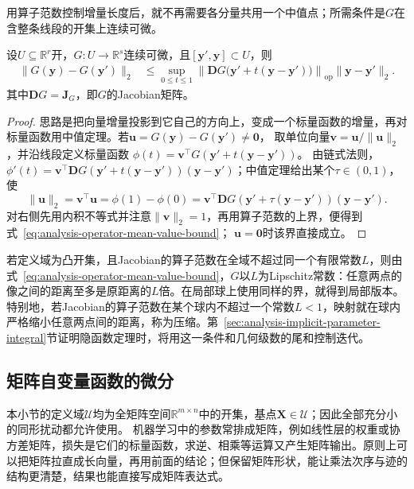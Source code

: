 用算子范数控制增量长度后，就不再需要各分量共用一个中值点；所需条件是$G$在含整条线段的开集上连续可微。
\begin{theorem}[向量值函数的中值估计]
\label{thm:multivariable-vector-mean-value}
设$U\subseteq\mathbb R^r$开，$G:U\to\mathbb R^s$连续可微，且$[\bm y',\bm y]\subset U$，则
\begin{equation}
  \begin{aligned}
  \lVert G(\bm{y})-G(\bm{y}')\rVert_2
  &\leq
  \sup_{0\leq t\leq1}
  \left\lVert
    \bm{D}G\bigl(\bm{y}'+t(\bm{y}-\bm{y}')\bigr)
  \right\rVert_{\mathrm{op}}
  \lVert\bm{y}-\bm{y}'\rVert_2.
  \end{aligned}
\label{eq:analysis-operator-mean-value-bound}
\end{equation}
其中$\bm DG=\bm J_G$，即$G$的Jacobian矩阵。
\end{theorem}
\begin{proof}
思路是把向量增量投影到它自己的方向上，变成一个标量函数的增量，再对标量函数用中值定理。若$\bm u=G(\bm y)-G(\bm y')\neq\bm0$，
取单位向量$\bm v=\bm u/\lVert\bm u\rVert_2$，并沿线段定义标量函数
$\phi(t)=\bm v^\top G(\bm y'+t(\bm y-\bm y'))$。
由链式法则，$\phi'(t)=\bm v^\top\bm DG(\bm y'+t(\bm y-\bm y'))(\bm y-\bm y')$；中值定理给出某个$\tau\in(0,1)$，使
\[
 \lVert\bm u\rVert_2
 =\bm v^\top\bm u
 =\phi(1)-\phi(0)
 =\bm v^\top\bm DG(\bm y'+\tau(\bm y-\bm y'))(\bm y-\bm y').
\]
对右侧先用内积不等式并注意$\lVert\bm v\rVert_2=1$，再用算子范数的上界，便得到式~\eqref{eq:analysis-operator-mean-value-bound}；
$\bm u=\bm0$时该界直接成立。
\end{proof}
若定义域为凸开集，且Jacobian的算子范数在全域不超过同一个有限常数$L$，则由式~\eqref{eq:analysis-operator-mean-value-bound}，$G$以$L$为Lipschitz常数：任意两点的像之间的距离至多是原距离的$L$倍。在局部球上使用同样的界，就得到局部版本。
特别地，若Jacobian的算子范数在某个球内不超过一个常数$L<1$，映射就在球内严格缩小任意两点间的距离，称为压缩。第~\ref{sec:analysis-implicit-parameter-integral}节证明隐函数定理时，将用这一条件和几何级数的尾和控制迭代。

\subsection{矩阵自变量函数的微分}

本小节的定义域$\mathcal U$均为全矩阵空间$\mathbb R^{m\times n}$中的开集，基点$\bm X\in\mathcal U$；因此全部充分小的同形扰动都允许使用。
机器学习中的参数常排成矩阵，例如线性层的权重或协方差矩阵，损失是它们的标量函数，求逆、相乘等运算又产生矩阵输出。原则上可以把矩阵拉直成长向量，再用前面的结论；但保留矩阵形状，能让乘法次序与迹的结构更清楚，结果也能直接写成矩阵表达式。


